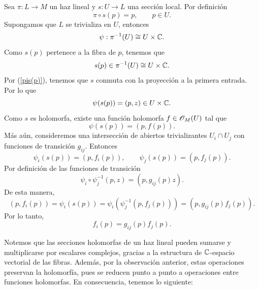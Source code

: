 	\begin{remark}\label{seccionlocalholomorfa}
		Sea $\pi:L\to M$ un haz lineal y $s:U\to L$ una sección local. Por definición
		\begin{equation}\label{pis(p)}
			\pi \circ s(p)=p,\qquad p\in U.
		\end{equation} 
		Supongamos que $L$ se trivializa en $U$, entonces
		\begin{equation*}
			\psi:\pi^{-1}(U)\cong U\times \mathbb{C}.
		\end{equation*}
		Como $s(p)$ pertenece a la fibra de $p$, tenemos que
		\begin{equation*}
			s(p)\in \pi^{-1}(U)\cong U\times \mathbb{C}.
		\end{equation*}
		Por (\ref{pis(p)}), tenemos que $s$ conmuta con la proyección a la primera entrada. Por lo que
		\begin{equation*}
			\psi(s(p))=(p,z)\in U\times \mathbb{C}.
		\end{equation*}
		Como $s$ es holomorfa, existe una función holomorfa $f\in \mathscr{O}_M(U)$ tal que
		\begin{equation*}
			\psi(s(p))=(p,f(p)).
		\end{equation*}
		Más aún, consideremos una intersección de abiertos trivializantes $U_i\cap U_j$ con funciones de transición $g_{ij}$. Entonces
		\begin{equation*}
			\psi_i(s(p))=(p,f_i(p)),\qquad \psi_j(s(p))=(p,f_j(p)).
		\end{equation*}
		Por definición de las funciones de transición
		\begin{equation*}
			\psi_i\circ \psi_j^{-1}(p,z)=(p,g_{ij}(p)z).
		\end{equation*}
		De esta manera,
		\begin{equation*}
			(p,f_i(p))=\psi_i(s(p))=\psi_i(\psi_j^{-1}(p,f_j(p)))=(p,g_{ij}(p)f_j(p)).
		\end{equation*}
		Por lo tanto, 
		\begin{equation*}
			f_i(p)=g_{ij}(p)f_j(p).
		\end{equation*}
	\end{remark}
	
	Notemos que las secciones holomorfas de un haz lineal pueden sumarse y multiplicarse por escalares complejos, gracias a la estructura de $\mathbb{C}$-espacio vectorial de las fibras. Además, por la observación anterior, estas operaciones preservan la holomorfía, pues se reducen punto a punto a operaciones entre funciones holomorfas. En consecuencia, tenemos lo siguiente:
	
